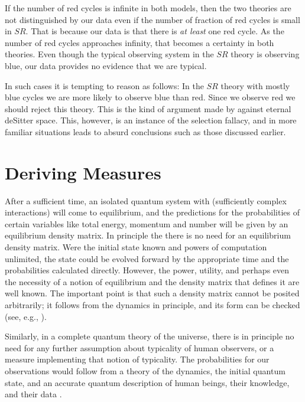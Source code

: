 \documentclass[pra,floatfix,preprint,nofootinbib,12pt]{revtex4}
\begin{document}
If the number of red cycles is infinite in both models, then the two theories are not distinguished by our data even if the number of fraction of red cycles is small in $SR$. That is because our data is that there is {\it at least} one red cycle. As the number of red cycles approaches infinity, that becomes a certainty in both theories. Even though the typical observing system in the $SR$ theory is observing blue, our data provides no evidence that we are typical. 

In such cases it is tempting to reason as follows:  In the $SR$ theory with mostly blue cycles we are more likely to observe blue than red. Since we observe red we should reject this theory. This is the kind of argument made by \cite{DKS02} against eternal deSitter space.  This, however, is an instance of the selection fallacy, and in more familiar situations leads to absurd conclusions such as those discussed earlier. 

\section{Deriving Measures}
 After a sufficient time,  an isolated quantum system with (sufficiently complex interactions) will come to equilibrium, and the predictions for the probabilities of certain variables like total energy, momentum and number will be given by an equilibrium density matrix. In principle the there is no need for  an equilibrium density matrix. Were the initial state known and powers of computation unlimited, the state could be evolved forward by the appropriate time and the probabilities calculated directly. However,  the power, utility, and perhaps even the necessity of a notion of equilibrium and the density matrix that defines it are well known. The important point is that such a density matrix cannot be posited arbitrarily; it follows from the dynamics in principle, and its form can be checked (see, e.g., \cite{Sred94}). 

Similarly, in a complete quantum theory of the universe, there is in principle no need for any further assumption about typicality of human observers, or a measure implementing that notion of typicality.  The probabilities for our observations would follow from a theory of the dynamics, the initial quantum state, and an accurate quantum description of human beings, their knowledge, and their data \cite{Har04}.
\end{document}
